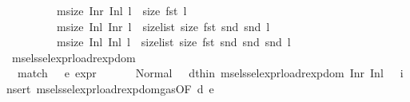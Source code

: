 \begin{isabellebody}
\ \ \ \ \ \ \ \ {\isacharbar}{\kern0pt}\ {\isachardoublequoteopen}msize\ {\isacharparenleft}{\kern0pt}Inr\ {\isacharparenleft}{\kern0pt}Inl\ l{\isacharparenright}{\kern0pt}{\isacharparenright}{\kern0pt}\ {\isacharequal}{\kern0pt}\ size\ {\isacharparenleft}{\kern0pt}fst\ l{\isacharparenright}{\kern0pt}{\isachardoublequoteclose}\isanewline
\ \ \ \ \ \ \ \ {\isacharbar}{\kern0pt}\ {\isachardoublequoteopen}msize\ {\isacharparenleft}{\kern0pt}Inl\ {\isacharparenleft}{\kern0pt}Inr\ l{\isacharparenright}{\kern0pt}{\isacharparenright}{\kern0pt}\ {\isacharequal}{\kern0pt}\ size{\isacharunderscore}{\kern0pt}list\ size\ {\isacharparenleft}{\kern0pt}fst\ {\isacharparenleft}{\kern0pt}snd\ {\isacharparenleft}{\kern0pt}snd\ l{\isacharparenright}{\kern0pt}{\isacharparenright}{\kern0pt}{\isacharparenright}{\kern0pt}{\isachardoublequoteclose}\isanewline
\ \ \ \ \ \ \ \ {\isacharbar}{\kern0pt}\ {\isachardoublequoteopen}msize\ {\isacharparenleft}{\kern0pt}Inl\ {\isacharparenleft}{\kern0pt}Inl\ l{\isacharparenright}{\kern0pt}{\isacharparenright}{\kern0pt}\ {\isacharequal}{\kern0pt}\ size{\isacharunderscore}{\kern0pt}list\ size\ {\isacharparenleft}{\kern0pt}fst\ {\isacharparenleft}{\kern0pt}snd\ {\isacharparenleft}{\kern0pt}snd\ {\isacharparenleft}{\kern0pt}snd\ l{\isacharparenright}{\kern0pt}{\isacharparenright}{\kern0pt}{\isacharparenright}{\kern0pt}{\isacharparenright}{\kern0pt}{\isachardoublequoteclose}\isanewline
\isanewline
{}\isamarkupfalse%
\ msel{\isacharunderscore}{\kern0pt}ssel{\isacharunderscore}{\kern0pt}expr{\isacharunderscore}{\kern0pt}load{\isacharunderscore}{\kern0pt}rexp{\isacharunderscore}{\kern0pt}dom\ {\isacharequal}{\kern0pt}\isanewline
\ \ match\ \ \ e{\isacharcolon}{\kern0pt}\ {\isachardoublequoteopen}expr\ {\isacharunderscore}{\kern0pt}\ {\isacharunderscore}{\kern0pt}\ {\isacharunderscore}{\kern0pt}\ {\isacharunderscore}{\kern0pt}\ {\isacharunderscore}{\kern0pt}\ {\isacharequal}{\kern0pt}\ Normal\ {\isacharparenleft}{\kern0pt}{\isacharunderscore}{\kern0pt}{\isacharcomma}{\kern0pt}{\isacharunderscore}{\kern0pt}{\isacharparenright}{\kern0pt}{\isachardoublequoteclose}\ \ d{\isacharbrackleft}{\kern0pt}thin{\isacharbrackright}{\kern0pt}{\isacharcolon}{\kern0pt}\ {\isachardoublequoteopen}msel{\isacharunderscore}{\kern0pt}ssel{\isacharunderscore}{\kern0pt}expr{\isacharunderscore}{\kern0pt}load{\isacharunderscore}{\kern0pt}rexp{\isacharunderscore}{\kern0pt}dom\ {\isacharparenleft}{\kern0pt}Inr\ {\isacharparenleft}{\kern0pt}Inl\ {\isacharunderscore}{\kern0pt}{\isacharparenright}{\kern0pt}{\isacharparenright}{\kern0pt}{\isachardoublequoteclose}\ {\isasymRightarrow}\ {\isacartoucheopen}insert\ msel{\isacharunderscore}{\kern0pt}ssel{\isacharunderscore}{\kern0pt}expr{\isacharunderscore}{\kern0pt}load{\isacharunderscore}{\kern0pt}rexp{\isacharunderscore}{\kern0pt}dom{\isacharunderscore}{\kern0pt}gas{\isacharparenleft}{\kern0pt}{}{\isacharparenright}{\kern0pt}{\isacharbrackleft}{\kern0pt}OF\ d\ e{\isacharbrackright}{\kern0pt}{\isacartoucheclose}\ {\isacharbar}{\kern0pt}\isanewline

\end{isabellebody}

